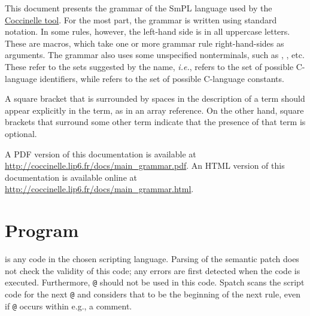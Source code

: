 

This document presents the grammar of the SmPL language used by the
\href{http://coccinelle.lip6.fr/}{Coccinelle tool}.  For the most
part, the grammar is written using standard notation.  In some rules,
however, the left-hand side is in all uppercase letters.  These are
macros, which take one or more grammar rule right-hand-sides as
arguments.  The grammar also uses some unspecified nonterminals, such
as , , etc.  These refer to the sets suggested by
the name, {\em i.e.},  refers to the set of possible
C-language identifiers, while  refers to the set of
possible C-language constants.

A square bracket that is surrounded by spaces in the description of a term
should appear explicitly in the term, as in an array reference.  On the
other hand, square brackets that surround some other term indicate that the
presence of that term is optional.

%
\ifhevea
A PDF version of this documentation is available at
\url{http://coccinelle.lip6.fr/docs/main_grammar.pdf}.
\else
An HTML version of this documentation is available online at
\url{http://coccinelle.lip6.fr/docs/main_grammar.html}.
\fi

\section{Program}

\begin{grammar}


\end{grammar}

\noindent
{} is any code in the chosen scripting language.  Parsing of
the semantic patch does not check the validity of this code; any errors are
first detected when the code is executed.  Furthermore, \texttt{@} should
not be used in this code.  Spatch scans the script code for the next
\texttt{@} and considers that to be the beginning of the next rule, even if
\texttt{@} occurs within e.g., a comment.

